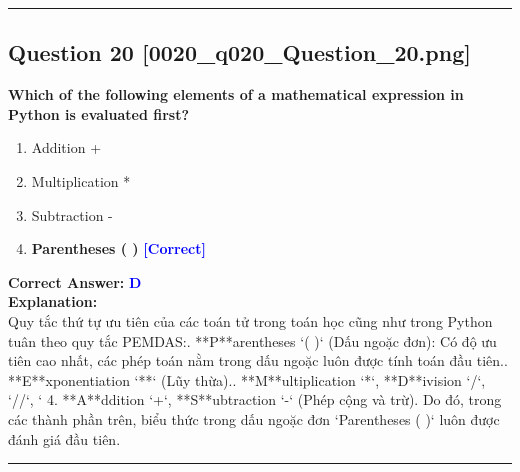 \documentclass[11pt,a4paper]{article}
\begin{document}
\vspace{0.8cm}
\hrule
\vspace{0.5cm}

\begin{minipage}{\textwidth}
\subsection*{Question 20 \quad \footnotesize{[0020_q020_Question_20.png]}}
\noindent \textbf{Which of the following elements of a mathematical expression in Python is evaluated first?}

\begin{enumerate}[label=\Alph*.]
    \item Addition +
    \item Multiplication *
    \item Subtraction -
    \item \textbf{Parentheses ( )} \hfill \textcolor{blue}{\textbf{[Correct]}}
\end{enumerate}

\noindent \textbf{Correct Answer:} \textcolor{blue}{\textbf{D}} \\[4pt]
\noindent \textbf{Explanation:}\\
Quy tắc thứ tự ưu tiên của các toán tử trong toán học cũng như trong Python tuân theo quy tắc PEMDAS:. **P**arentheses `( )` (Dấu ngoặc đơn): Có độ ưu tiên cao nhất, các phép toán nằm trong dấu ngoặc luôn được tính toán đầu tiên.. **E**xponentiation `**` (Lũy thừa).. **M**ultiplication `*`, **D**ivision `/`, `//`, `%
4. **A**ddition `+`, **S**ubtraction `-` (Phép cộng và trừ).\newline
Do đó, trong các thành phần trên, biểu thức trong dấu ngoặc đơn `Parentheses ( )` luôn được đánh giá đầu tiên.
\end{minipage}
\vspace{0.8cm}
\hrule
\vspace{0.5cm}
\end{document}
